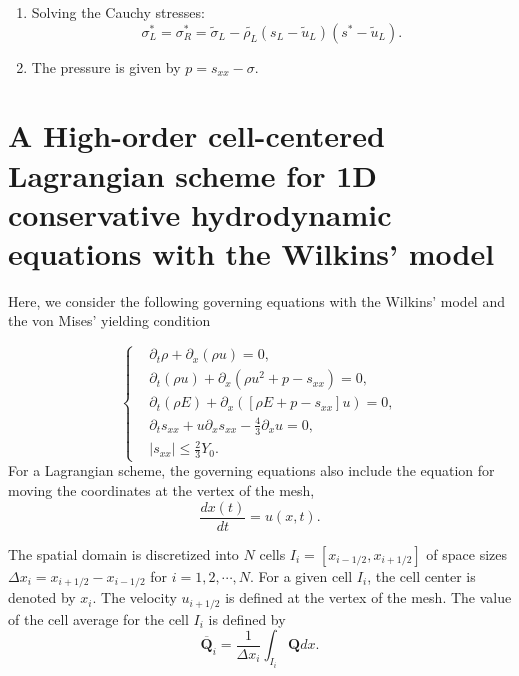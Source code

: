 \documentclass[review]{elsarticle}
\begin{document}
\begin{enumerate}
\begin{enumerate}
    \item Solving the Cauchy stresses:
\begin{equation*}
  \sigma_L^*=\sigma_R^*=\widetilde{\sigma}_L -\widetilde{\rho_L} (s_L-\widetilde{u}_L)(s^*-\widetilde{u}_L).
\end{equation*}

     \item The pressure is given by $p =s_{xx}-\sigma$.
  \end{enumerate}
\end{enumerate}

 \section{ A High-order cell-centered Lagrangian scheme for 1D  conservative hydrodynamic equations with the Wilkins' model}
Here, we consider the following governing equations with the  Wilkins' model  and  the von Mises' yielding condition

\begin{equation}\label{eq:gveq}
   \left\{ \begin{aligned}
       & \partial _t \rho +\partial_x(\rho u)=0,\\
       & \partial _t (\rho u)+\partial_x(\rho u^2 + p -s_{xx})=0,\\
       &\partial _t (\rho E)+\partial_x([\rho E + p -s_{xx}]u)=0,\\
       &\partial _t s_{xx}+u\partial_xs_{xx}-\frac{4}{3}\partial_x u=0,\\
& |s_{xx}|\leq\frac{2}{3}Y_{0}.
       \end{aligned}\right.
\end{equation}
For a Lagrangian scheme, the governing equations also include the equation for moving the coordinates at the vertex of the mesh,
\begin{equation}\label{eq:dxt}
  \frac{dx(t)}{dt} = u(x,t).
\end{equation}

The spatial domain is discretized into $N$ cells $I_i = [x_{i-1/2}, x_{i+1/2}]$ of space sizes $\Delta x_i = x_{i+1/2} - x_{i-1/2}$ for $i = 1,2,\cdots,N$. For a given cell $I_i$, the cell center is denoted by $x_i$. The velocity $u_{i+1/2}$ is defined at the vertex of the mesh. The  value of the cell average for the cell $I_i$ is defined by
\begin{equation}
  \overline{\mathbf{Q}}_i = \frac{1}{\Delta x_i} \int_{I_i} \mathbf{Q} dx.
\end{equation}
\end{document}
